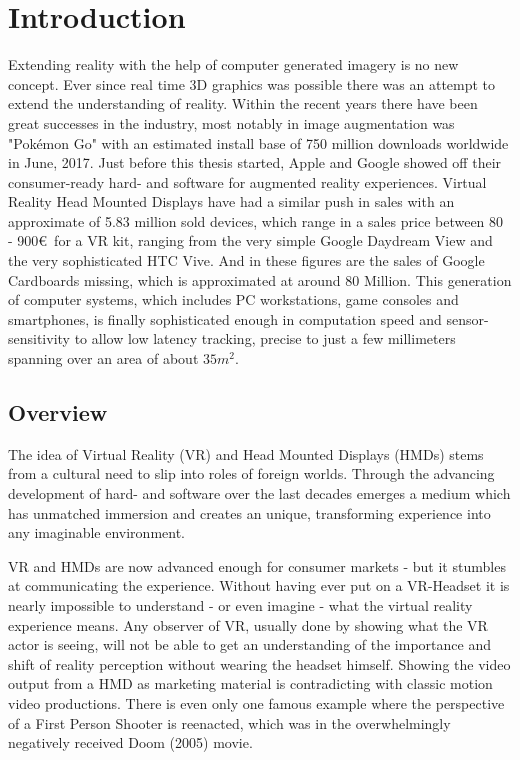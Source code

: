 %
\chapter{Introduction}
\label{sec:intro}


Extending reality with the help of computer generated imagery is no new 
concept. Ever since real time 3D graphics was possible there was an attempt to 
extend the understanding of reality. Within the recent years there have been 
great successes in the industry, most notably in image augmentation was 
"Pokémon Go" with an estimated install base of 750 million downloads 
worldwide in June, 2017. \cite{appannie:2017}  Just before this thesis 
started, Apple and Google showed off their consumer-ready hard- and software 
for augmented reality experiences.
\newline
Virtual Reality Head Mounted Displays have had a similar push in sales with an 
approximate of 5.83 million sold devices, which range in a sales price between 
80 - 900€ for a VR kit, ranging from the very simple Google Daydream View and 
the very sophisticated HTC Vive. \cite{erguerel:2017} And in these figures are 
the sales of Google Cardboards missing, which is approximated at around 80 
Million.
\newline
This generation of computer systems, which includes PC workstations, game 
consoles and smartphones, is finally sophisticated enough in computation speed 
and sensor-sensitivity to allow low latency tracking, precise to just a few 
millimeters spanning over an area of about $35m^2$.

\section{Overview}
\label{sec:intro:outline}

The idea of Virtual Reality (VR) and Head Mounted Displays (HMDs) stems from a 
cultural need to slip into roles of foreign worlds. Through the advancing 
development of hard- and software over the last decades emerges a medium which 
has unmatched immersion and creates an unique, transforming experience into any 
imaginable environment.

VR and HMDs are now advanced enough for consumer markets - but it stumbles at 
communicating the experience. Without having ever put on a VR-Headset it is 
nearly impossible to understand - or even imagine - what the virtual reality 
experience means. Any observer of VR, usually done by showing what 
the VR actor is seeing, will not be able to get an understanding of the 
importance and shift of reality perception without wearing the headset himself.
\newline
Showing the video output from a HMD as marketing material is contradicting with 
classic motion video productions. There is even only one famous example where 
the perspective of a First Person Shooter is reenacted, which was in the 
overwhelmingly negatively received Doom (2005) movie.

